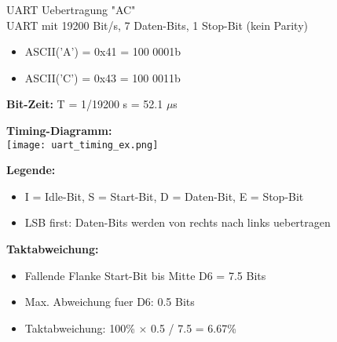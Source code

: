 \begin{example2}{UART Uebertragung "AC"}\\
    UART mit 19200 Bit/s, 7 Daten-Bits, 1 Stop-Bit (kein Parity)
    \begin{itemize}
        \item ASCII('A') = 0x41 = 100 0001b
        \item ASCII('C') = 0x43 = 100 0011b
    \end{itemize}
    
    \tcblower
    
    \textbf{Bit-Zeit:} T = 1/19200 s = 52.1 $\mu$s
    
    \textbf{Timing-Diagramm:}\\
    \texttt{[image: uart\_timing\_ex.png]}
    
    \textbf{Legende:}
    \begin{itemize}
        \item I = Idle-Bit, S = Start-Bit, D = Daten-Bit, E = Stop-Bit
        \item LSB first: Daten-Bits werden von rechts nach links uebertragen
    \end{itemize}
    
    \textbf{Taktabweichung:}
    \begin{itemize}
        \item Fallende Flanke Start-Bit bis Mitte D6 = 7.5 Bits
        \item Max. Abweichung fuer D6: 0.5 Bits
        \item Taktabweichung: 100\% $\times$ 0.5 / 7.5 = 6.67\%
    \end{itemize}
\end{example2}


